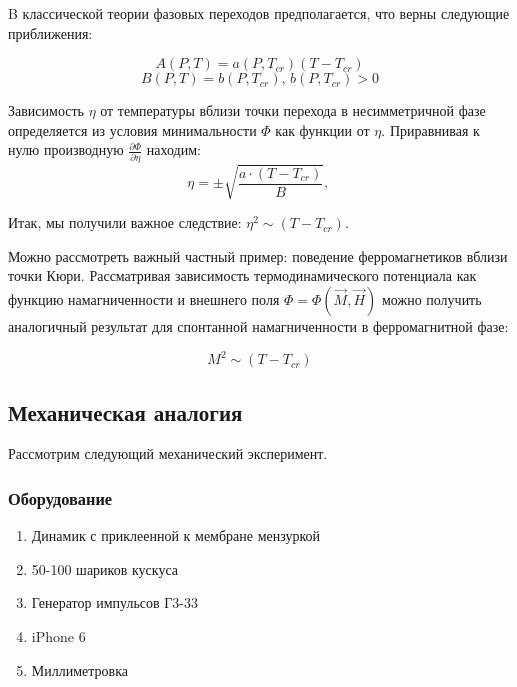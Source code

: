 \documentclass[a4paper, 12pt]{article}
\begin{document}
B классической теории фазовых переходов предполагается, что верны следующие приближения:

$$
A(P, T) = a(P, T_{cr}) (T - T_{cr}) 
$$
$$
B(P, T) = b(P, T_{cr}) \text{, } b(P, T_{cr}) > 0
$$

Зависимость $\eta$ от температуры вблизи точки перехода в несимметричной фазе определяется из условия минимальности $\Phi$ как функции от $\eta$. Приравнивая к нулю производную $\frac{\partial \Phi}{\partial \eta}$ находим: 
$$
	\eta = \pm \sqrt{ \frac{a \cdot (T - T_{cr})}{B} } \text{, }
$$

Итак, мы получили важное следствие: $\eta^2 \sim (T - T_{cr})$. 

Можно рассмотреть важный частный пример: поведение ферромагнетиков вблизи точки Кюри. Рассматривая зависимость термодинамического потенциала как функцию намагниченности и внешнего поля $\Phi = \Phi(\vec{M}, \vec{H})$ можно получить аналогичный результат для спонтанной намагниченности в ферромагнитной фазе:

$$
	M^2 \sim (T - T_{cr})
$$


\subsection*{Механическая аналогия}

Рассмотрим следующий механический эксперимент. 

\subsubsection*{Оборудование}

\begin{enumerate}
	\item Динамик с приклеенной к мембране мензуркой
	\item 50-100 шариков кускуса
	\item Генератор импульсов Г3-33
	\item iPhone 6
	\item Миллиметровка
\end{enumerate}
\end{document}
